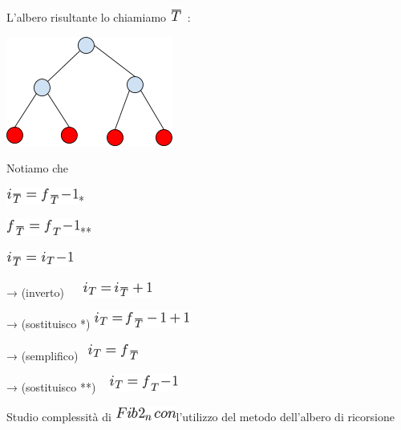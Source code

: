 \documentclass{article}
\begin{document}
{L'albero risultante lo chiamiamo
}\includegraphics{images/image44.png}{~:}

{\includegraphics{images/image522.png}}

{}

{Notiamo che }

\includegraphics{images/image45.png}{*}

{}

\includegraphics{images/image46.png}{**}

\includegraphics{images/image47.png}{~ ~}

{→ (inverto) ~ ~}\includegraphics{images/image48.png}{~ }

{→ (sostituisco }{*}{) }\includegraphics{images/image49.png}

{→ (semplifico) ~}\includegraphics{images/image50.png}{~ }

{→ (sostituisco }{**}{) ~ }\includegraphics{images/image38.png}

{}

{Studio complessità di }\includegraphics{images/image51.png}{l'utilizzo
del metodo dell'albero di ricorsione}
\end{document}
